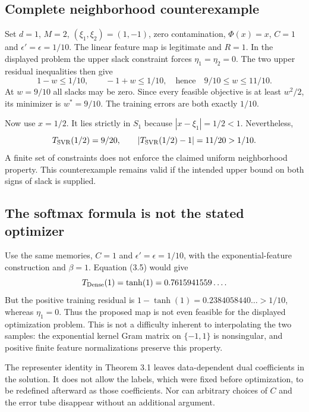 \documentclass[10pt]{article}
\begin{document}
\subsection*{Complete neighborhood counterexample}
Set \(d=1\), \(M=2\), \((\xi_1,\xi_2)=(1,-1)\), zero contamination, \(\Phi(x)=x\), \(C=1\) and \(\epsilon'=\epsilon=1/10\). The linear feature map is legitimate and \(R=1\). In the displayed problem the upper slack constraint forces \(\eta_1=\eta_2=0\). The two upper residual inequalities then give \[1-w\le 1/10,\qquad -1+w\le 1/10,
 \quad\text{hence}\quad 9/10\le w\le11/10 .\] At \(w=9/10\) all slacks may be zero. Since every feasible objective is at least \(w^2/2\), its minimizer is \(w^*=9/10\). The training errors are both exactly \(1/10\).\par
Now use \(x=1/2\). It lies strictly in \(S_1\) because \(|x-\xi_1|=1/2<1\). Nevertheless, \[T_{\rm SVR}(1/2)=9/20,\qquad
 |T_{\rm SVR}(1/2)-1|=11/20>1/10 .\] A finite set of constraints does not enforce the claimed uniform neighborhood property. This counterexample remains valid if the intended upper bound on both signs of slack is supplied.\par
\subsection*{The softmax formula is not the stated optimizer}
Use the same memories, \(C=1\) and \(\epsilon'=\epsilon=1/10\), with the exponential-feature construction and \(\beta=1\). Equation (3.5) would give \[T_{\rm Dense}(1)=\tanh(1)=0.7615941559\ldots.\] But the positive training residual is \(1-\tanh(1)=0.2384058440\ldots>1/10\), whereas \(\eta_1=0\). Thus the proposed map is not even feasible for the displayed optimization problem. This is not a difficulty inherent to interpolating the two samples: the exponential kernel Gram matrix on \(\{-1,1\}\) is nonsingular, and positive finite feature normalizations preserve this property.\par
The representer identity in Theorem 3.1 leaves data-dependent dual coefficients in the solution. It does not allow the labels, which were fixed before optimization, to be redefined afterward as those coefficients. Nor can arbitrary choices of \(C\) and the error tube disappear without an additional argument.\par
\end{document}
